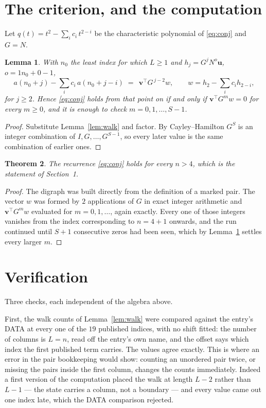 \documentclass[11pt,a4paper]{article}
\theoremstyle{plain}
\newtheorem{theorem}{Theorem}
\newtheorem{lemma}[theorem]{Lemma}
\theoremstyle{definition}
\begin{document}
\section{The criterion, and the computation}

Let $q(t)=t^{2}-\sum_i c_i\,t^{2-i}$ be the characteristic polynomial of
\eqref{eq:conj} and $G=N$.

\begin{lemma}\label{lem:crit}
With $n_0$ the least index for which $L\ge1$ and $h_j=G^{j}N^{o}\mathbf{u}$,
$o=1n_0+0-1$,
\[
a(n_0+j)-\sum_i c_i\,a(n_0+j-i)\;=\;\,\mathbf{v}^{\!\top}G^{\,j-2}w,
\qquad w=h_{2}-\sum_i c_i h_{2-i},
\]
for $j\ge2$. Hence \eqref{eq:conj} holds from that point on if and only if
$\mathbf{v}^{\!\top}G^{m}w=0$ for every $m\ge0$, and it is enough to check
$m=0,1,\dots,S-1$.
\end{lemma}

\begin{proof}
Substitute Lemma~\ref{lem:walk} and factor. By Cayley--Hamilton $G^{S}$ is an integer
combination of $I,G,\dots,G^{S-1}$, so every later value is the same combination of earlier
ones.
\end{proof}

\begin{theorem}
The recurrence \eqref{eq:conj} holds for every $n>4$, which is the statement of
Section~1.
\end{theorem}

\begin{proof}
The digraph was built directly from the definition of a marked pair. The vector $w$ was
formed by $2$ applications of $G$ in exact integer arithmetic and
$\mathbf{v}^{\!\top}G^{m}w$ evaluated for $m=0,1,\dots$, again exactly. Every one of
those integers vanishes from the index corresponding to $n=4+1$ onwards, and the run
continued until $S+1$ consecutive zeros had been seen, which by Lemma~\ref{lem:crit}
settles every larger $m$.
\end{proof}

\section{Verification}

Three checks, each independent of the algebra above.

First, the walk counts of Lemma~\ref{lem:walk} were compared against the entry's DATA at
every one of the $19$ published indices, with no shift fitted: the number of columns is
$L=n$, read off the entry's own name, and the offset says which index the first
published term carries. The values agree exactly. This is where an error in the pair
bookkeeping would show: counting an unordered pair twice, or missing the pairs inside the
first column, changes the counts immediately. Indeed a first version of the computation
placed the walk at length $L-2$ rather than $L-1$ --- the state carries a column, not a
boundary --- and every value came out one index late, which the DATA comparison rejected.
\end{document}
